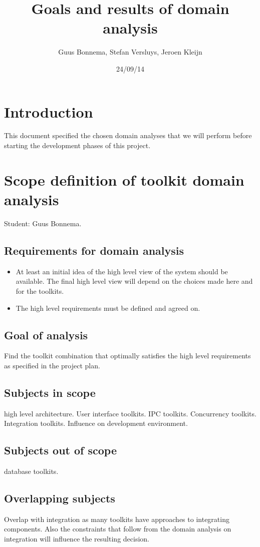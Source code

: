 \documentclass[a4paper,11pt]{article}
\author{Guus Bonnema, Stefan Versluys, Jeroen Kleijn}
\date{24/09/14}
\title{Goals and results of domain analysis}
\begin{document}

\newcommand{\xmas}{x\textsc{mas}}%

\maketitle

\section{Introduction}
This document specified the chosen domain analyses that we will perform before starting the development phases
of this project.

\section{Scope definition of toolkit domain analysis}
Student: Guus Bonnema.
\subsection{Requirements for domain analysis}
\begin{itemize}
    \item At least an initial idea of the high level view of the system should be available. The final high level
	    view will depend on the choices made here and for the toolkits.
    \item The high level requirements must be defined and agreed on.
\end{itemize}
\subsection{Goal of analysis}
Find the toolkit combination that optimally satisfies the high level requirements as specified in the project plan.
\subsection{Subjects in scope}
high level architecture. User interface toolkits. IPC toolkits. Concurrency toolkits. Integration toolkits.
Influence on development environment.
\subsection{Subjects out of scope}
database toolkits.
\subsection{Overlapping subjects}
Overlap with integration as many toolkits have approaches to integrating components. Also the constraints that follow
from the domain analysis on integration will influence the resulting decision.
\end{document}
